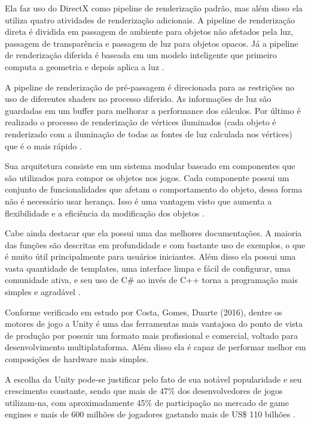 Ela faz uso do DirectX como pipeline de renderização padrão, mas além disso ela utiliza quatro atividades de renderização adicionais. A pipeline de renderização direta é dividida em passagem de ambiente para objetos não afetados pela luz, passagem de transparência e passagem de luz para objetos opacos. Já a pipeline de renderização diferida é baseada em um modelo inteligente que primeiro computa a geometria e depois aplica a luz \cite{simon2015unity}.

A pipeline de renderização de pré-passagem é direcionada para as restrições no uso de diferentes shaders no processo diferido. As informações de luz são guardadas em um buffer para melhorar a performance dos cálculos. Por último é realizado o processo de renderização de vértices iluminados (cada objeto é renderizado com a iluminação de todas as fontes de luz calculada nos vértices) que é o mais rápido \cite{simon2015unity}. 

Sua arquitetura consiste em um sistema modular baseado em componentes que são utilizados para compor os objetos nos jogos. Cada componente possui um conjunto de funcionalidades que afetam o comportamento do objeto, dessa forma não é necessário usar herança. Isso é uma vantagem visto que aumenta a flexibilidade e a eficiência da modificação dos objetos \cite{compStudyGE}.

Cabe ainda destacar que ela possui uma das melhores documentações. A maioria das funções são descritas em profundidade e com bastante uso de exemplos, o que é muito útil principalmente para usuários iniciantes. Além disso ela possui uma vasta quantidade de templates, uma interface limpa e fácil de configurar, uma comunidade ativa, e seu uso de C\# ao invés de C++ torna a programação mais simples e agradável \cite{compStudyGE}.

Conforme verificado em estudo por Costa, Gomes, Duarte (2016)\nocite{estudoUnity}, dentre os motores de jogo a Unity é uma das ferramentas mais vantajosa do ponto de vista de produção por possuir um formato mais profissional e comercial, voltado para desenvolvimento multiplataforma. Além disso ela é capaz de performar melhor em composições de hardware mais simples.

A escolha da Unity pode-se justificar pelo fato de sua notável popularidade e seu crescimento constante, sendo que mais de 47\% dos desenvolvedores de jogos utilizam-na, com aproximadamente 45\% de participação no mercado de game engines e mais de 600 milhões de jogadores gastando mais de US\$ 110 bilhões \cite{simon2015unity}.

